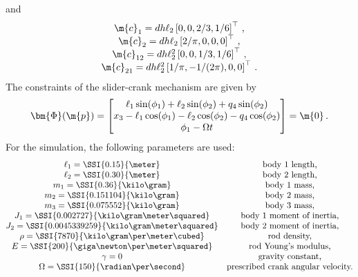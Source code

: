 %
and
%
\begin{equation*}
  \begin{matrix}
    \m{c}_{1}  = d h \ell_2  \left[ 0,     0,         2/3, 1/6 \right]^\top \, \text{,} \\
    \m{c}_{2}  = d h \ell_2  \left[ 2/\pi, 0,         0,   0   \right]^\top \, \text{,} \\
    \m{c}_{12} = d h \ell_2^2\left[ 0,     0,         1/3, 1/6 \right]^\top \, \text{,} \\
    \m{c}_{21} = d h \ell_2^2\left[ 1/\pi, -1/(2\pi), 0,   0   \right]^\top \, \text{.}
  \end{matrix}
\end{equation*}
%
The constraints of the slider-crank mechanism are given by
%
\begin{equation*}
  \bm{\Phi}(\m{p}) = \begin{bmatrix}
    \ell_1\sin(\phi_1) + \ell_2\sin(\phi_2) + q_4\sin(\phi_2) \\
    x_3 - \ell_1\cos(\phi_1) - \ell_2\cos(\phi_2) - q_4\cos(\phi_2) \\
    \phi_1 - \Omega t \\
  \end{bmatrix} = \m{0} \, \text{.}
\end{equation*}
%
For the simulation, the following parameters are used:
%
\begin{equation*}
  \begin{matrix}
    \ell_1 = \SSI{0.15}{\meter} & \text{body 1 length,} \\
    \ell_2 = \SSI{0.30}{\meter} & \text{body 2 length,} \\
    m_1 = \SSI{0.36}{\kilo\gram} & \text{body 1 mass,} \\
    m_2 = \SSI{0.151104}{\kilo\gram} & \text{body 2 mass,} \\
    m_3 = \SSI{0.075552}{\kilo\gram} & \text{body 3 mass,} \\
    J_1 = \SSI{0.002727}{\kilo\gram\meter\squared} & \text{body 1 moment of inertia,} \\
    J_2 = \SSI{0.0045339259}{\kilo\gram\meter\squared} & \text{body 2 moment of inertia,} \\
    \rho = \SSI{7870}{\kilo\gram\per\meter\cubed} & \text{rod density,} \\
    E = \SSI{200}{\giga\newton\per\meter\squared} & \text{rod Young's modulus,} \\
    \gamma = 0 & \text{gravity constant,} \\
    \Omega = \SSI{150}{\radian\per\second} & \text{prescribed crank angular velocity.} \\
  \end{matrix}
\end{equation*}
